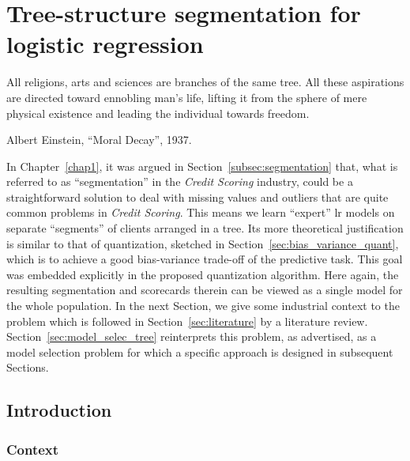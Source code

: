 \chapter{Tree-structure segmentation for logistic regression} \label{chap6}


\epigraph{All religions, arts and sciences are branches of the same tree. All these aspirations are directed toward ennobling man's life, lifting it from the sphere of mere physical existence and leading the individual towards freedom.}{Albert Einstein, ``Moral Decay'', 1937.}

\minitoc

\bigskip

In Chapter~\ref{chap1}, it was argued in Section~\ref{subsec:segmentation} that, what is referred to as ``segmentation'' in the \textit{Credit Scoring} industry, could be a straightforward solution to deal with missing values and outliers that are quite common problems in \textit{Credit Scoring}. This means we learn ``expert'' \gls{lr} models on separate ``segments'' of clients arranged in a tree. Its more theoretical justification is similar to that of quantization, sketched in Section~\ref{sec:bias_variance_quant}, which is to achieve a good bias-variance trade-off of the predictive task. This goal was embedded explicitly in the proposed quantization algorithm. Here again, the resulting segmentation and scorecards therein can be viewed as a single model for the whole population. In the next Section, we give some industrial context to the problem which is followed in Section~\ref{sec:literature} by a literature review. Section~\ref{sec:model_selec_tree} reinterprets this problem, as advertised, as a model selection problem for which a specific approach is designed in subsequent Sections.


\section{Introduction}

\subsection{Context} \label{subsec:context}

